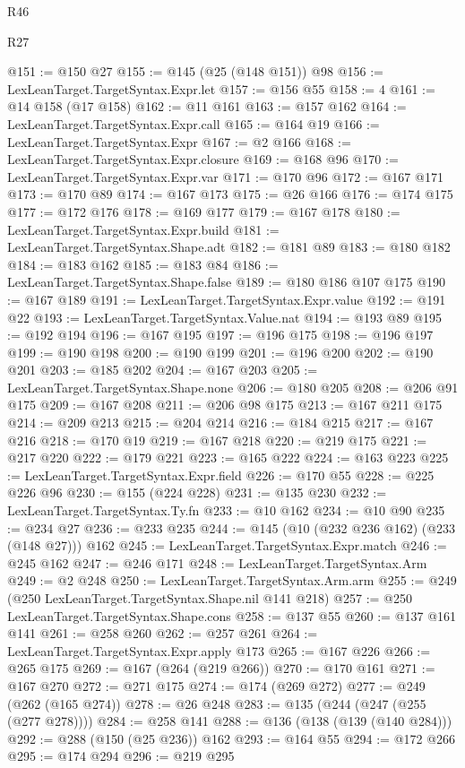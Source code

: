 \begin{lexlean}{R46}
\begin{lexlean}{R27}
\begin{coremodule}
{{{{{{{{{{{{{{{{{{{{{{{{{{{{{{{{{{{{{{{{{{{{{{{{{{{{{{{{{{{{{{@151 := @150 @27
@155 := @145 (@25 (@148 @151)) @98
@156 := LexLeanTarget.TargetSyntax.Expr.let
@157 := @156 @55
@158 := 4
@161 := @14 @158 (@17 @158)
@162 := @11 @161
@163 := @157 @162
@164 := LexLeanTarget.TargetSyntax.Expr.call
@165 := @164 @19
@166 := LexLeanTarget.TargetSyntax.Expr
@167 := @2 @166
@168 := LexLeanTarget.TargetSyntax.Expr.closure
@169 := @168 @96
@170 := LexLeanTarget.TargetSyntax.Expr.var
@171 := @170 @96
@172 := @167 @171
@173 := @170 @89
@174 := @167 @173
@175 := @26 @166
@176 := @174 @175
@177 := @172 @176
@178 := @169 @177
@179 := @167 @178
@180 := LexLeanTarget.TargetSyntax.Expr.build
@181 := LexLeanTarget.TargetSyntax.Shape.adt
@182 := @181 @89
@183 := @180 @182
@184 := @183 @162
@185 := @183 @84
@186 := LexLeanTarget.TargetSyntax.Shape.false
@189 := @180 @186 @107 @175
@190 := @167 @189
@191 := LexLeanTarget.TargetSyntax.Expr.value
@192 := @191 @22
@193 := LexLeanTarget.TargetSyntax.Value.nat
@194 := @193 @89
@195 := @192 @194
@196 := @167 @195
@197 := @196 @175
@198 := @196 @197
@199 := @190 @198
@200 := @190 @199
@201 := @196 @200
@202 := @190 @201
@203 := @185 @202
@204 := @167 @203
@205 := LexLeanTarget.TargetSyntax.Shape.none
@206 := @180 @205
@208 := @206 @91 @175
@209 := @167 @208
@211 := @206 @98 @175
@213 := @167 @211 @175
@214 := @209 @213
@215 := @204 @214
@216 := @184 @215
@217 := @167 @216
@218 := @170 @19
@219 := @167 @218
@220 := @219 @175
@221 := @217 @220
@222 := @179 @221
@223 := @165 @222
@224 := @163 @223
@225 := LexLeanTarget.TargetSyntax.Expr.field
@226 := @170 @55
@228 := @225 @226 @96
@230 := @155 (@224 @228)
@231 := @135 @230
@232 := LexLeanTarget.TargetSyntax.Ty.fn
@233 := @10 @162
@234 := @10 @90
@235 := @234 @27
@236 := @233 @235
@244 := @145 (@10 (@232 @236 @162) (@233 (@148 @27))) @162
@245 := LexLeanTarget.TargetSyntax.Expr.match
@246 := @245 @162
@247 := @246 @171
@248 := LexLeanTarget.TargetSyntax.Arm
@249 := @2 @248
@250 := LexLeanTarget.TargetSyntax.Arm.arm
@255 := @249 (@250 LexLeanTarget.TargetSyntax.Shape.nil @141 @218)
@257 := @250 LexLeanTarget.TargetSyntax.Shape.cons
@258 := @137 @55
@260 := @137 @161 @141
@261 := @258 @260
@262 := @257 @261
@264 := LexLeanTarget.TargetSyntax.Expr.apply @173
@265 := @167 @226
@266 := @265 @175
@269 := @167 (@264 (@219 @266))
@270 := @170 @161
@271 := @167 @270
@272 := @271 @175
@274 := @174 (@269 @272)
@277 := @249 (@262 (@165 @274))
@278 := @26 @248
@283 := @135 (@244 (@247 (@255 (@277 @278))))
@284 := @258 @141
@288 := @136 (@138 (@139 (@140 @284)))
@292 := @288 (@150 (@25 @236)) @162
@293 := @164 @55
@294 := @172 @266
@295 := @174 @294
@296 := @219 @295
}}}}}}}}}}}}}}}}}}}}}}}}}}}}}}}}}}}}}}}}}}}}}}}}}}}}}}}}}}}}}}
\end{coremodule}
\end{lexlean}
\end{lexlean}
